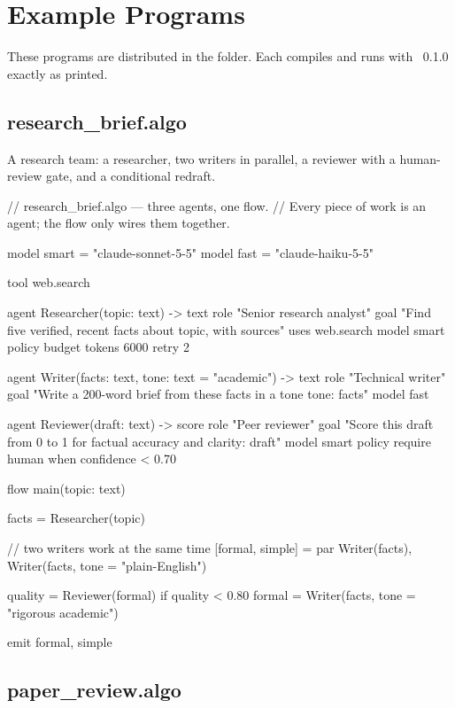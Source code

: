 \chapter{Example Programs}
\label{app:examples}

These programs are distributed in the  folder. Each compiles and runs with \algolang~0.1.0 exactly as printed.

\section{research\_brief.algo}

A research team: a researcher, two writers in parallel, a reviewer with a human-review gate, and a conditional redraft.

\begin{algo}[title=research\_brief.algo]
// research_brief.algo — three agents, one flow.
// Every piece of work is an agent; the flow only wires them together.

model smart = "claude-sonnet-5-5"
model fast  = "claude-haiku-5-5"

tool web.search

agent Researcher(topic: text) -> text {
    role  "Senior research analyst"
    goal  "Find five verified, recent facts about {topic}, with sources"
    uses  web.search
    model smart
    policy {
        budget tokens 6000
        retry 2
    }
}

agent Writer(facts: text, tone: text = "academic") -> text {
    role  "Technical writer"
    goal  "Write a 200-word brief from these facts in a {tone} tone: {facts}"
    model fast
}

agent Reviewer(draft: text) -> score {
    role  "Peer reviewer"
    goal  "Score this draft from 0 to 1 for factual accuracy and clarity: {draft}"
    model smart
    policy {
        require human when confidence < 0.70
    }
}

flow main(topic: text) {
    facts = Researcher(topic)

    // two writers work at the same time
    [formal, simple] = par {
        Writer(facts),
        Writer(facts, tone = "plain-English")
    }

    quality = Reviewer(formal)
    if quality < 0.80 {
        formal = Writer(facts, tone = "rigorous academic")
    }

    emit formal, simple
}
\end{algo}

\section{paper\_review.algo}


